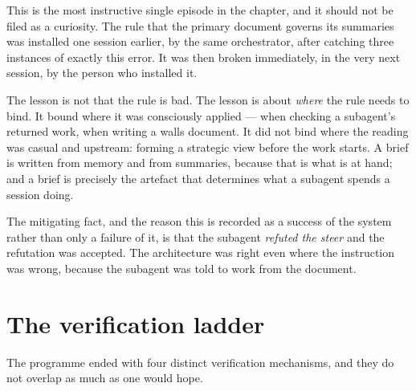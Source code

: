 \begin{obsv}
\label{obs:rule-broken-next-session}
This is the most instructive single episode in the chapter, and it should not
be filed as a curiosity. The rule that the primary document governs its
summaries was installed one session earlier, by the same orchestrator, after
catching three instances of exactly this error. It was then broken
immediately, in the very next session, by the person who installed it.

\smallskip
The lesson is not that the rule is bad. The lesson is about \emph{where} the
rule needs to bind. It bound where it was consciously applied --- when
checking a subagent's returned work, when writing a walls document. It did not
bind where the reading was casual and upstream: forming a strategic view
before the work starts. A brief is written from memory and from summaries,
because that is what is at hand; and a brief is precisely the artefact that
determines what a subagent spends a session doing.

\smallskip
The mitigating fact, and the reason this is recorded as a success of the
system rather than only a failure of it, is that the subagent \emph{refuted the
steer} and the refutation was accepted. The architecture was right even where
the instruction was wrong, because the subagent was told to work from the
document.
\end{obsv}

\section{The verification ladder}
\label{sec:ladder}

The programme ended with four distinct verification mechanisms, and they do
not overlap as much as one would hope.

